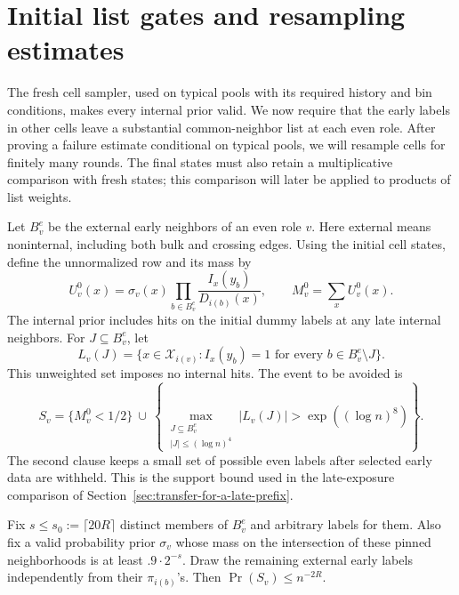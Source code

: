 \section{Initial list gates and resampling estimates}
\label{sec:initial-list-gates-and-resampling-estimates}

The fresh cell sampler, used on typical pools with its required history
and bin conditions, makes every internal prior valid. We now require
that the early labels in other cells leave a substantial common-neighbor
list at each even role. After proving a failure estimate conditional on
typical pools, we will resample cells for finitely many rounds. The final
states must also retain a multiplicative comparison with fresh states;
this comparison will later be applied to products of list weights.

Let \(B_v^e\) be the external early neighbors of an even role \(v\).
Here external means noninternal, including both bulk and crossing edges.
Using the initial cell states, define the unnormalized row and its mass by
\[
 U_v^0(x)=\sigma_v(x)\prod_{b\in B_v^e}
                   \frac{I_x(y_b)}{D_{i(b)}(x)},\qquad
 M_v^0=\sum_x U_v^0(x).
\]
The internal prior includes hits on the initial dummy labels at any late
internal neighbors. For \(J\subseteq B_v^e\), let
\[
 L_v(J)=\{x\in\mathcal X_{i(v)}:
                  I_x(y_b)=1\text{ for every }b\in B_v^e\setminus J\}.
\]
This unweighted set imposes no internal hits. The event to be avoided is
\[
 S_v=\{M_v^0<1/2\}\ \cup\
 \left\{\max_{\substack{J\subseteq B_v^e\\|J|\le(\log n)^4}}
                       |L_v(J)|>\exp((\log n)^8)\right\}.
\]
The second clause keeps a small set of possible even labels after selected
early data are withheld. This is the support bound used in the late-exposure
comparison of Section~\ref{sec:transfer-for-a-late-prefix}.

\begin{lemma}\label{lem:independent-pinned-list}
Fix \(s\le s_0:=\lceil20R\rceil\) distinct members of \(B_v^e\) and
arbitrary labels for them. Also fix a valid probability prior \(\sigma_v\)
whose mass on the intersection of these pinned neighborhoods is at least
\(.9\cdot2^{-s}\). Draw the remaining external early labels independently
from their \(\pi_{i(b)}\)'s. Then \(\Pr(S_v)\le n^{-2R}\).
\end{lemma}

